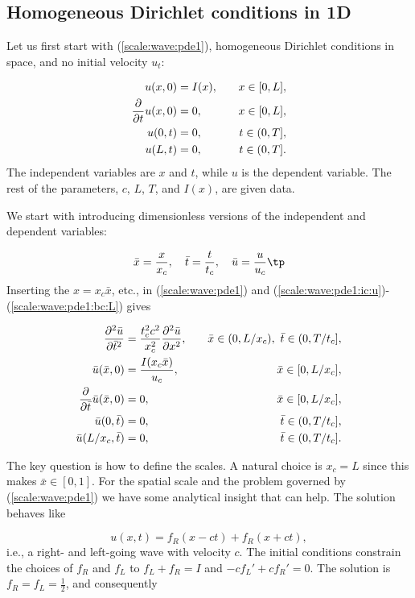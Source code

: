 \documentclass[graybox,envcountchap,sectrefs,final]{svmonodo}
\begin{document}
\subsection{Homogeneous Dirichlet conditions in 1D}
\label{sec:scale:wave:bc_u0}

Let us first start with (\ref{scale:wave:pde1}),
homogeneous Dirichlet conditions in space, and
no initial velocity $u_t$:

\begin{align}
u(x,0) &= I(x), \quad &x\in [0,L],
\label{scale:wave:pde1:ic:u}\\ 
{\partial\over\partial t}u(x,0) &= 0, \quad & x\in [0,L],
\label{scale:wave:pde1:ic:ut}\\ 
u(0,t) & = 0, \quad  & t\in (0,T],
\label{scale:wave:pde1:bc:0}\\ 
u(L,t) & = 0, \quad  & t\in (0,T].
\label{scale:wave:pde1:bc:L}
\end{align}
The independent variables are $x$ and $t$, while $u$ is the dependent
variable.
The rest of the parameters, $c$, $L$, $T$, and $I(x)$, are given data.

We start with introducing dimensionless versions of the independent and
dependent variables:

\[
\bar x = \frac{x}{x_c},\quad \bar t=\frac{t}{t_c},\quad\bar u=\frac{u}{u_c}
\tp
\]
Inserting the $x=x_c\bar x$, etc., in (\ref{scale:wave:pde1}) and
(\ref{scale:wave:pde1:ic:u})-(\ref{scale:wave:pde1:bc:L}) gives

\begin{align*}
\frac{\partial^2 \bar u}{\partial \bar t^2} &=
\frac{t_c^2c^2}{x_c^2}{\partial^2 \bar u\over\partial x^2}, \quad & \bar x\in (0,L/x_c),\ \bar t\in (0,T/t_c],
\\ 
\bar u(\bar x,0) &= \frac{I(x_c\bar x)}{u_c},
\quad &\bar x\in [0,L/x_c],
\\ 
\frac{\partial}{\partial \bar t}\bar u(\bar x,0) &= 0,
\quad & \bar x\in [0,L/x_c],
\\ 
\bar u(0,\bar t) & = 0,
\quad  & \bar t\in (0,T/t_c],
\\ 
\bar u(L/x_c,\bar t) & = 0,
\quad &\bar t\in (0,T/t_c].
\end{align*}

The key question is how to define the scales.
A natural choice is $x_c=L$ since this makes $\bar x\in [0,1]$.
For the spatial scale and the problem governed by
(\ref{scale:wave:pde1}) we
have some analytical insight that can help.
The solution behaves like

\begin{equation}
u(x,t) = f_R(x-ct) + f_R(x+ct),
\label{scale:wave:pde:sol:general}
\end{equation}
i.e., a right- and left-going wave with velocity $c$. The initial
conditions constrain the choices of $f_R$ and $f_L$ to $f_L + f_R=I$
and $-cf_L' + cf_R' = 0$. The solution is $f_R = f_L = \frac{1}{2}$,
and consequently
\end{document}
